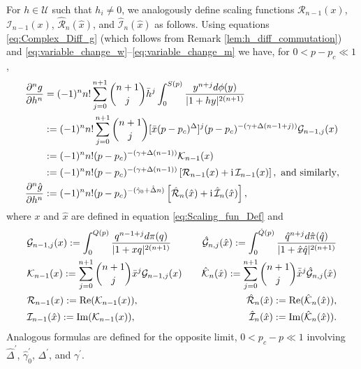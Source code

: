 \documentclass[english,12pt]{ttuthes}
\newcommand{\gh}{\hat{\gamma}}
\newcommand{\Dh}{\hat{\Delta}}
\newcommand{\qh}{\hat{q}}
\newcommand{\xh}{\hat{x}}
\newcommand{\I}{\mathrm{i}}
\begin{document}
For $h\in\mathcal{U}$ such that $h_i\neq0$, we analogously define scaling
functions $\mathcal{R}_{n-1}(x)$, $\mathcal{I}_{n-1}(x)$,
$\hat{\mathcal{R}}_{n}(\xh)$, and $\hat{\mathcal{I}}_{n}(\xh)$ as
follows. Using equations \eqref{eq:Complex_Diff_g} (which follows from
Remark \ref{lem:h_diff_commutation}) and
\eqref{eq:variable_change_w}--\eqref{eq:variable_change_m} we have,
for $0<p-p_c\ll1$,  
%
\begin{align}\label{eq:Complex_Scaling_fun_Def}
\frac{\partial^ng}{\partial h^n}   
   &=(-1)^nn!\sum_{j=0}^{n+1}{n+1 \choose j}\bar{h}^j
                 \int_0^{S(p)}\frac{y^{n+j}d\phi(y)}{|1+hy|^{2(n+1)}}\\
   &:=(-1)^nn!\sum_{j=0}^{n+1}{n+1 \choose j}[\bar{x}(p-p_c)^\Delta]^j
                 (p-p_c)^{-(\gamma+\Delta(n-1+j))}\mathcal{G}_{n-1,j}(x)\notag\\
   &:=(-1)^nn!(p-p_c)^{-(\gamma+\Delta(n-1))}\mathcal{K}_{n-1}(x)\notag\\
   &:=(-1)^nn!(p-p_c)^{-(\gamma+\Delta(n-1))}
      \left[\mathcal{R}_{n-1}(x)+\I\,\mathcal{I}_{n-1}(x)\right],
   \text{ and similarly}, \notag\\
\frac{\partial^n\hat{g}}{\partial h^n}
     &:=(-1)^nn!(p-p_c)^{-(\gh_0+\Dh n)}
       \left[\hat{\mathcal{R}}_{n}(\xh)+\I\,\hat{\mathcal{I}}_{n}(\xh)\right],\notag
\end{align}
%
where $x$ and $\xh$ are defined in equation \eqref{eq:Scaling_fun_Def}
and  
%
\begin{align}\label{eq:Complex_Scaling_fun_Def_Integrals}
 &\mathcal{G}_{n-1,j}(x):=\int_0^{Q(p)}\frac{q^{n-1+j}d\pi(q)}{|1+xq|^{2(n+1)}}
 &&
 &\hat{\mathcal{G}}_{n,j}(\xh):=\int_0^{\hat{Q}(p)}\frac{\qh^{n+j}d\hat{\pi}(\qh)}{|1+\xh\qh|^{2(n+1)}}
 \\
 &\mathcal{K}_{n-1}(x):=\sum_{j=0}^{n+1}{n+1 \choose j}\bar{x}^j
                       \mathcal{G}_{n-1,j}(x)
 &&
 &\hat{\mathcal{K}}_n(\xh):=\sum_{j=0}^{n+1}{n+1 \choose j}\bar{\xh}^j
                       \hat{\mathcal{G}}_{n,j}(\xh)
 \notag\\
 &\mathcal{R}_{n-1}(x):=\text{Re}(\mathcal{K}_{n-1}(x)),
 &&
 &\hat{\mathcal{R}}_n(\xh):=\text{Re}(\hat{\mathcal{K}}_n(\xh)),
   \notag\\   
 &\mathcal{I}_{n-1}(\xh):=\text{Im}(\mathcal{K}_{n-1}(x)),
 &&
 &\hat{\mathcal{I}}_n(\xh):=\text{Im}(\hat{\mathcal{K}}_n(\xh)).
 \notag
\end{align}
%
Analogous formulas are defined for the opposite limit, $0<p_c-p\ll1$
involving $\Dh^\prime$, $\gh^\prime_0$, $\Delta^\prime$, and $\gamma^\prime$. 
\end{document}

